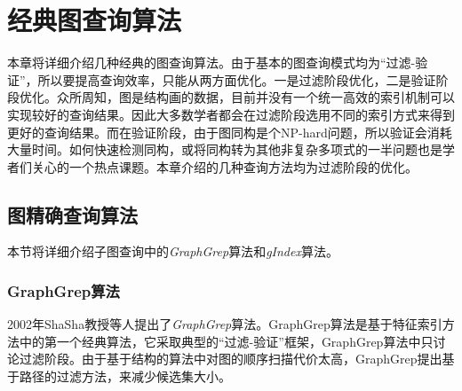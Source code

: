 \documentclass{XDBAthesis}
\begin{document}
\else
\fi
\chapter{经典图查询算法}
\label{chap:classic}
本章将详细介绍几种经典的图查询算法。由于基本的图查询模式均为“过滤-验证”，所以要提高查询效率，只能从两方面优化。一是过滤阶段优化，二是验证阶段优化。众所周知，图是结构画的数据，目前并没有一个统一高效的索引机制可以实现较好的查询结果。因此大多数学者都会在过滤阶段选用不同的索引方式来得到更好的查询结果。而在验证阶段，由于图同构是个NP-hard问题，所以验证会消耗大量时间。如何快速检测同构，或将同构转为其他非复杂多项式的一半问题也是学者们关心的一个热点课题。本章介绍的几种查询方法均为过滤阶段的优化。
\section{图精确查询算法}
本节将详细介绍子图查询中的\emph{GraphGrep}算法\cite{graphgrep}和\emph{gIndex}算法\cite{gIndex}。
\subsection{GraphGrep算法}
2002年ShaSha教授等人提出了\emph{GraphGrep}算法。GraphGrep算法是基于特征索引方法中的第一个经典算法，它采取典型的“过滤-验证”框架，GraphGrep算法中只讨论过滤阶段。由于基于结构的算法中对图的顺序扫描代价太高，GraphGrep提出基于路径的过滤方法，来减少候选集大小。
\end{document}
